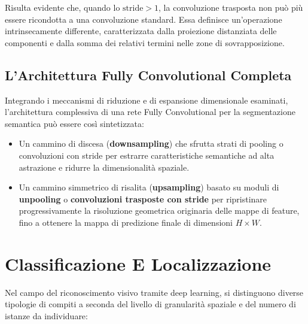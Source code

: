 ﻿\documentclass[11pt, a4paper]{article}
\begin{document}
Risulta evidente che, quando lo $\text{stride} > 1$, la convoluzione trasposta non può più essere ricondotta a una convoluzione standard. Essa definisce un'operazione intrinsecamente differente, caratterizzata dalla proiezione distanziata delle componenti e dalla somma dei relativi termini nelle zone di sovrapposizione.

\newpage

\subsection{L'Architettura Fully Convolutional Completa}

Integrando i meccanismi di riduzione e di espansione dimensionale esaminati, l'architettura complessiva di una rete Fully Convolutional per la segmentazione semantica può essere così sintetizzata:

\begin{itemize}[noitemsep]
    \item Un cammino di discesa (\textbf{downsampling}) che sfrutta strati di pooling o convoluzioni con stride per estrarre caratteristiche semantiche ad alta astrazione e ridurre la dimensionalità spaziale.
    \item Un cammino simmetrico di risalita (\textbf{upsampling}) basato su moduli di \textbf{unpooling} o \textbf{convoluzioni trasposte con stride} per ripristinare progressivamente la risoluzione geometrica originaria delle mappe di feature, fino a ottenere la mappa di predizione finale di dimensioni $H \times W$.
\end{itemize}


\newpage

\section{Classificazione E Localizzazione}

Nel campo del riconoscimento visivo tramite deep learning, si distinguono diverse tipologie di compiti a seconda del livello di granularità spaziale e del numero di istanze da individuare:

\end{document}
